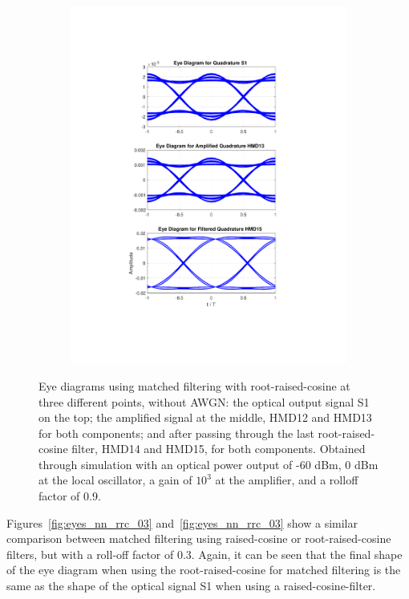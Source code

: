 \begin{figure}[H]
\begin{subfigure}{.45\textwidth}
		\includegraphics[clip, trim=5cm 4cm 5cm 4cm,
			width=\textwidth]{./sdf/m_qam_system/figures/eyes/q_nn_p_60_09.pdf}
	\end{subfigure}
	\caption{Eye diagrams using matched filtering with root-raised-cosine
		at three different points, without AWGN: the optical output signal S1 on the
		top; the amplified signal at the middle, HMD12 and HMD13 for both components;
		and after passing through the last root-raised-cosine filter, HMD14 and HMD15,
		for both components. Obtained through simulation with an optical power output
		of -60 dBm, 0 dBm at the local oscillator, a gain of $10^3$ at the amplifier,
		and a rolloff factor of 0.9.\label{fig:eyes_nn_rrc_09}}
	
\end{figure}

Figures~\ref{fig:eyes_nn_rrc_03} and~\ref{fig:eyes_nn_rrc_03} show a similar
comparison between matched filtering using raised-cosine or root-raised-cosine
filters, but with a roll-off factor of 0.3. Again, it can be seen that the
final shape of the eye diagram when using the root-raised-cosine for matched
filtering is the same as the shape of the optical signal S1 when using a
raised-cosine-filter.

